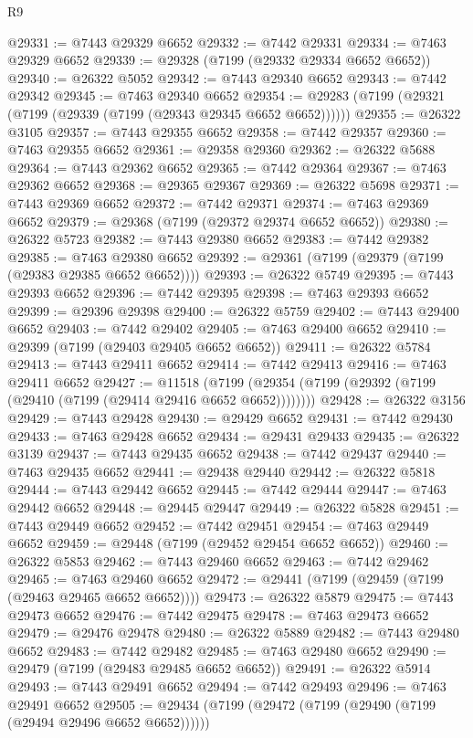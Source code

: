 \begin{lexlean}{R9}
\begin{coremodule}
@29331 := @7443 @29329 @6652
@29332 := @7442 @29331
@29334 := @7463 @29329 @6652
@29339 := @29328 (@7199 (@29332 @29334 @6652 @6652))
@29340 := @26322 @5052
@29342 := @7443 @29340 @6652
@29343 := @7442 @29342
@29345 := @7463 @29340 @6652
@29354 := @29283 (@7199 (@29321 (@7199 (@29339 (@7199 (@29343 @29345 @6652 @6652))))))
@29355 := @26322 @3105
@29357 := @7443 @29355 @6652
@29358 := @7442 @29357
@29360 := @7463 @29355 @6652
@29361 := @29358 @29360
@29362 := @26322 @5688
@29364 := @7443 @29362 @6652
@29365 := @7442 @29364
@29367 := @7463 @29362 @6652
@29368 := @29365 @29367
@29369 := @26322 @5698
@29371 := @7443 @29369 @6652
@29372 := @7442 @29371
@29374 := @7463 @29369 @6652
@29379 := @29368 (@7199 (@29372 @29374 @6652 @6652))
@29380 := @26322 @5723
@29382 := @7443 @29380 @6652
@29383 := @7442 @29382
@29385 := @7463 @29380 @6652
@29392 := @29361 (@7199 (@29379 (@7199 (@29383 @29385 @6652 @6652))))
@29393 := @26322 @5749
@29395 := @7443 @29393 @6652
@29396 := @7442 @29395
@29398 := @7463 @29393 @6652
@29399 := @29396 @29398
@29400 := @26322 @5759
@29402 := @7443 @29400 @6652
@29403 := @7442 @29402
@29405 := @7463 @29400 @6652
@29410 := @29399 (@7199 (@29403 @29405 @6652 @6652))
@29411 := @26322 @5784
@29413 := @7443 @29411 @6652
@29414 := @7442 @29413
@29416 := @7463 @29411 @6652
@29427 := @11518
    (@7199 (@29354 (@7199 (@29392 (@7199 (@29410 (@7199 (@29414 @29416 @6652 @6652))))))))
@29428 := @26322 @3156
@29429 := @7443 @29428
@29430 := @29429 @6652
@29431 := @7442 @29430
@29433 := @7463 @29428 @6652
@29434 := @29431 @29433
@29435 := @26322 @3139
@29437 := @7443 @29435 @6652
@29438 := @7442 @29437
@29440 := @7463 @29435 @6652
@29441 := @29438 @29440
@29442 := @26322 @5818
@29444 := @7443 @29442 @6652
@29445 := @7442 @29444
@29447 := @7463 @29442 @6652
@29448 := @29445 @29447
@29449 := @26322 @5828
@29451 := @7443 @29449 @6652
@29452 := @7442 @29451
@29454 := @7463 @29449 @6652
@29459 := @29448 (@7199 (@29452 @29454 @6652 @6652))
@29460 := @26322 @5853
@29462 := @7443 @29460 @6652
@29463 := @7442 @29462
@29465 := @7463 @29460 @6652
@29472 := @29441 (@7199 (@29459 (@7199 (@29463 @29465 @6652 @6652))))
@29473 := @26322 @5879
@29475 := @7443 @29473 @6652
@29476 := @7442 @29475
@29478 := @7463 @29473 @6652
@29479 := @29476 @29478
@29480 := @26322 @5889
@29482 := @7443 @29480 @6652
@29483 := @7442 @29482
@29485 := @7463 @29480 @6652
@29490 := @29479 (@7199 (@29483 @29485 @6652 @6652))
@29491 := @26322 @5914
@29493 := @7443 @29491 @6652
@29494 := @7442 @29493
@29496 := @7463 @29491 @6652
@29505 := @29434 (@7199 (@29472 (@7199 (@29490 (@7199 (@29494 @29496 @6652 @6652))))))

\end{coremodule}
\end{lexlean}
